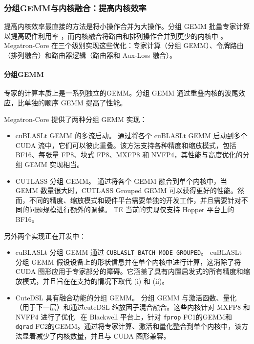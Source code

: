 \documentclass[10pt,logo,copyright]{nvidiatechreport_zh}
\begin{document}
\subsubsection{分组GEMM与内核融合：提高内核效率}\label{sec:kernel-fusion}

提高内核效率最直接的方法是将小操作合并为大操作。分组 GEMM 批量专家计算以提高硬件利用率 \cite{megablocks}，而内核融合将路由和排列操作合并到更少的内核中 \cite{chen2018tvm}。 Megatron-Core 在三个级别实现这些优化：专家计算（分组 GEMM）、令牌路由（排列融合）和路由器逻辑（路由器和 Aux-Loss 融合）。

\paragraph{分组GEMM}\label{sec:grouped-gemm}

专家的计算本质上是一系列独立的GEMM。分组 GEMM 通过重叠内核的波尾效应，比单独的顺序 GEMM 提高了性能。

Megatron-Core 提供了两种分组 GEMM 实现：

\begin{itemize}
\item[i.] cuBLASLt GEMM 的多流启动。
通过将各个 cuBLASLt GEMM 启动到多个 CUDA 流中，它们可以彼此重叠。该方法支持各种精度和缩放模式，包括 BF16、每张量 FP8、块式 FP8、MXFP8 和 NVFP4，其性能与高度优化的分组 GEMM 实现相当。

\item[ii.]\label{gmm:2} CUTLASS 分组 GEMM。
通过将各个 GEMM 融合到单个内核中，当 GEMM 数量很大时，CUTLASS Grouped GEMM 可以获得更好的性能。然而，不同的精度、缩放模式和硬件平台需要单独的开发工作，并且需要针对不同的问题规模进行额外的调整。 TE 当前的实现仅支持 Hopper 平台上的 BF16。
\end{itemize}


另外两个实现正在开发中：

\begin{itemize}
\item[iii.] cuBLASLt 分组 GEMM 通过 \texttt{CUBLASLT\_BATCH\_MODE\_GROUPED}。
cuBLASLt 分组 GEMM 假设设备上的形状信息并在单个内核中进行计算，这消除了将 CUDA 图形应用于专家部分的障碍。它涵盖了具有内置启发式的所有精度和缩放模式，并且旨在在支持的情况下取代 (i) 和 (ii)。

\item[iv.] CuteDSL 具有融合功能的分组 GEMM。
分组 GEMM 与激活函数、量化（用于下一层）和通过cuteDSL 缩放因子混合融合。这些内核针对 MXFP8 和 NVFP4 进行了优化~\cite{abecassis2025nvfp4} 在 Blackwell 平台上，针对 \texttt{fprop} FC1的GEMM和 \texttt{dgrad} FC2的GEMM。通过将专家计算、激活和量化整合到单个内核中，该方法显着减少了内核数量，并且与 CUDA 图形兼容。
\end{itemize}
\end{document}
